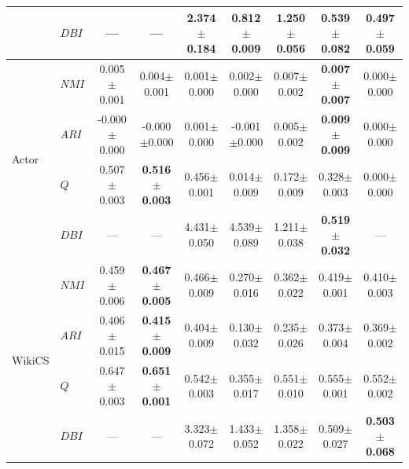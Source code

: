 \documentclass[twoside,twocolumn,10pt]{article}
\begin{document}
\begin{table}[t]
{\begin{tabular}{@{}llccccccc@{}}
 & $DBI$ & --- & --- & 2.374{\scriptsize$\pm$0.184} & 0.812{\scriptsize$\pm$0.009} & 1.250{\scriptsize$\pm$0.056} & 0.539{\scriptsize$\pm$0.082} & \textbf{0.497{\scriptsize$\pm$0.059}} \\
\midrule
\multirow{4}{*}{Actor} & $NMI$ & 0.005{\scriptsize$\pm$0.001} & 0.004{\scriptsize$\pm$0.001} & 0.001{\scriptsize$\pm$0.000} & 0.002{\scriptsize$\pm$0.000} & 0.007{\scriptsize$\pm$0.002} & \textbf{0.007{\scriptsize$\pm$0.007}} & 0.000{\scriptsize$\pm$0.000} \\
 & $ARI$ & -0.000{\scriptsize$\pm$0.000} & -0.000{\scriptsize$\pm$0.000} & 0.001{\scriptsize$\pm$0.000} & -0.001{\scriptsize$\pm$0.000} & 0.005{\scriptsize$\pm$0.002} & \textbf{0.009{\scriptsize$\pm$0.009}} & 0.000{\scriptsize$\pm$0.000} \\
 & $Q$ & 0.507{\scriptsize$\pm$0.003} & \textbf{0.516{\scriptsize$\pm$0.003}} & 0.456{\scriptsize$\pm$0.001} & 0.014{\scriptsize$\pm$0.009} & 0.172{\scriptsize$\pm$0.009} & 0.328{\scriptsize$\pm$0.003} & 0.000{\scriptsize$\pm$0.000} \\
 & $DBI$ & --- & --- & 4.431{\scriptsize$\pm$0.050} & 4.539{\scriptsize$\pm$0.089} & 1.211{\scriptsize$\pm$0.038} & \textbf{0.519{\scriptsize$\pm$0.032}} & --- \\
\midrule
\multirow{4}{*}{WikiCS} & $NMI$ & 0.459{\scriptsize$\pm$0.006} & \textbf{0.467{\scriptsize$\pm$0.005}} & 0.466{\scriptsize$\pm$0.009} & 0.270{\scriptsize$\pm$0.016} & 0.362{\scriptsize$\pm$0.022} & 0.419{\scriptsize$\pm$0.001} & 0.410{\scriptsize$\pm$0.003} \\
 & $ARI$ & 0.406{\scriptsize$\pm$0.015} & \textbf{0.415{\scriptsize$\pm$0.009}} & 0.404{\scriptsize$\pm$0.009} & 0.130{\scriptsize$\pm$0.032} & 0.235{\scriptsize$\pm$0.026} & 0.373{\scriptsize$\pm$0.004} & 0.369{\scriptsize$\pm$0.002} \\
 & $Q$ & 0.647{\scriptsize$\pm$0.003} & \textbf{0.651{\scriptsize$\pm$0.001}} & 0.542{\scriptsize$\pm$0.003} & 0.355{\scriptsize$\pm$0.017} & 0.551{\scriptsize$\pm$0.010} & 0.555{\scriptsize$\pm$0.001} & 0.552{\scriptsize$\pm$0.002} \\
 & $DBI$ & --- & --- & 3.323{\scriptsize$\pm$0.072} & 1.433{\scriptsize$\pm$0.052} & 1.358{\scriptsize$\pm$0.022} & 0.509{\scriptsize$\pm$0.027} & \textbf{0.503{\scriptsize$\pm$0.068}} \\
\bottomrule
\end{tabular}}%
\end{table}
\end{document}
